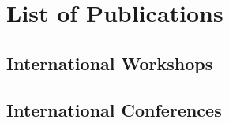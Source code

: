 \chapter*{List of Publications}

\section*{International Workshops}
\renewcommand{\labelenumi}{[IW-\arabic{enumi}]}
\begin{etaremune}
\end{etaremune}

\section*{International Conferences}
\renewcommand{\labelenumi}{[IC-\arabic{enumi}]}
\begin{etaremune}
\end{etaremune}
